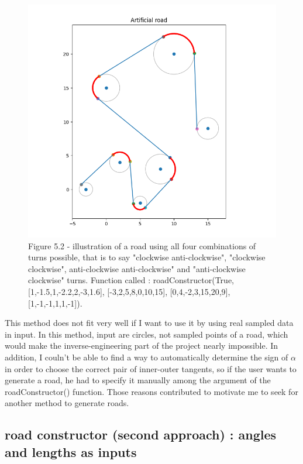 \documentclass[a4paper,12pt,fleqn]{article}
\begin{document}
\begin{figure}[H]
\centering
\includegraphics[width=\textwidth]{roadConstructorFinal}
Figure 5.2 - illustration of a road using all four combinations of turns possible, that is to say "clockwise anti-clockwise", "clockwise clockwise", anti-clockwise anti-clockwise" and "anti-clockwise clockwise" turns. Function called : roadConstructor(True, [1,-1.5,1,-2.2,2,-3,1.6], [-3,2,5,8,0,10,15], [0,4,-2,3,15,20,9], [1,-1,-1,1,1,-1]).
\end{figure}




This method does not fit very well if I want to use it by using real sampled data in input. In this method, input are circles, not sampled points of a road, which would make the inverse-engineering part of the project nearly impossible. In addition, I couln't be able to find a way to automatically determine the sign of  \mbox{$\alpha$} in order to choose the correct pair of inner-outer tangents, so if the user wants to generate a road, he had to specify it manually among the argument of the roadConstructor() function. Those reasons contributed to motivate me to seek for another method to generate roads.


\subsection{road constructor (second approach) : angles and lengths as inputs }
\end{document}
